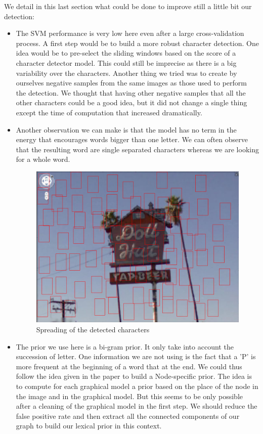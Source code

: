 \documentclass[10pt,a4paper]{article}
\begin{document}
We detail in this last section what could be done to improve still a little bit our detection:
\begin{itemize}
\item The SVM performance is very low here even after a large cross-validation process. A first step would be to build a more robust character detection. One idea would be to pre-select the sliding windows based on the score of a character detector model. This could still be imprecise as there is a big variability over the characters. Another thing we tried was to create by ourselves negative samples from the same images as those used to perform the detection. We thought that having other negative samples that all the other characters could be a good idea, but it did not change a single thing except the time of computation that increased dramatically. 

\item Another observation we can make is that the model has no term in the energy that encourages words bigger than one letter. We can often observe that the resulting word are single separated characters whereas we are looking for a whole word.
\begin{figure}[hc!]
\centering
\includegraphics[width=0.3\columnwidth]{figures/beer2.png}
\caption{Spreading of the detected characters}
\end{figure}

\item The prior we use here is a bi-gram prior. It only take into account the succession of letter. One information we are not using is the fact that a 'P' is more frequent at the beginning of a word that at the end. We could thus follow the idea given in the paper \cite{Mis} to build a Node-specific prior. The idea is to compute for each graphical model a prior based on the place of the node in the image and in the graphical model. But this seems to be only possible after a cleaning of the graphical model in the first step. We should reduce the false positive rate and then extract all the connected components of our graph to build our lexical prior in this context.
\end{itemize}






\newpage



\end{document}
